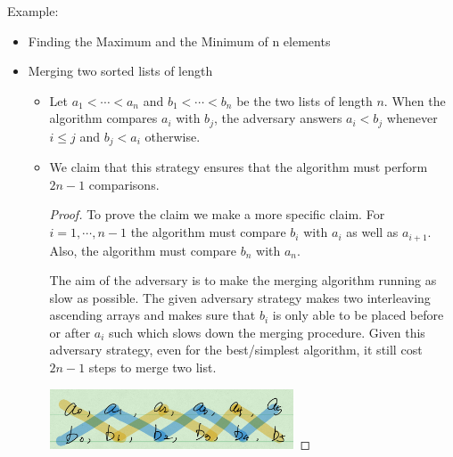 \documentclass[en,hazy,blue,screen,14pt]{elegantnote}
\begin{document}
Example:
\begin{itemize}
\item Finding the Maximum and the Minimum of n elements
\item Merging two sorted lists of length
\begin{itemize}
\item Let $a_{1}<\cdots<a_{n}$ and $b_{1}<\cdots<b_{n}$ be the two lists
of length $n$. When the algorithm compares $a_{i}$ with $b_{j}$,
the adversary answers $a_{i}<b_{j}$ whenever $i\le j$ and $b_{j}<a_{i}$
otherwise.
\item We claim that this strategy ensures that the algorithm must perform
$2n-1$ comparisons. 
\begin{proof}
To prove the claim we make a more specific claim. For $i=1,\cdots,n-1$
the algorithm must compare $b_{i}$ with $a_{i}$ as well as $a_{i+1}$.
Also, the algorithm must compare $b_{n}$ with $a_{n}$.

The aim of the adversary is to make the merging algorithm running
as slow as possible. The given adversary strategy makes two interleaving
ascending arrays and makes sure that $b_{i}$ is only able to be placed
before or after $a_{i}$ such which slows down the merging procedure.
Given this adversary strategy, even for the best/simplest algorithm,
it still cost $2n-1$ steps to merge two list. 

\centerline{\includegraphics[width=0.6\textwidth]{merging-two-sorted-lists}}


\end{proof}
\end{itemize}
\end{itemize}
\end{document}
